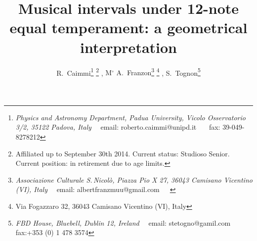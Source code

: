 \documentclass[12pt,a4paper]{article}
\begin{document}
%
%
%                      
%
\def\astrobj#1{#1}
\newenvironment{lefteqnarray}{\arraycolsep=0pt\begin{eqnarray}}
{\end{eqnarray}\protect\aftergroup\ignorespaces}
\newenvironment{lefteqnarray*}{\arraycolsep=0pt\begin{eqnarray*}}
{\end{eqnarray*}\protect\aftergroup\ignorespaces}
\newenvironment{leftsubeqnarray}{\arraycolsep=0pt\begin{subeqnarray}}
{\end{subeqnarray}\protect\aftergroup\ignorespaces}
\newcommand{\diff}{{\rm\,d}}
\newcommand{\pprime}{{\prime\prime}}
\newcommand{\szeta}{\mskip 3mu /\mskip-10mu \zeta}
\newcommand{\FC}{\mskip 0mu {\rm F}\mskip-10mu{\rm C}}
\newcommand{\appleq}{\stackrel{<}{\sim}}
\newcommand{\appgeq}{\stackrel{>}{\sim}}
\newcommand{\Int}{\mathop{\rm Int}\nolimits}
\newcommand{\Nint}{\mathop{\rm Nint}\nolimits}
\newcommand{\range}{{\rm -}}
\newcommand{\displayfrac}[2]{\frac{\displaystyle #1}{\displaystyle #2}}
%
\def\astrobj#1{#1}
%
\title{Musical intervals under 12-note equal temperament: 
a geometrical interpretation}
\author{
{R.~Caimmi}\footnote{
{\it Physics and Astronomy Department, Padua University, Vicolo Osservatorio
3/2, 35122 Padova, Italy}$\quad$
email: roberto.caimmi@unipd.it~~~
fax: 39-049-8278212}
\footnote{Affiliated up to September 30th 2014. Current status: Studioso
Senior. Current position: in retirement due to age limits.}
, {M$^\circ$ A.~Franzon}\footnote{
{\it Associazione Culturale S.\,Nicol\`o, Piazza Pio X 27,
36043 Camisano Vicentino (VI), Italy}$\quad$
email: albertfranzmuu@gmail.com~~~
}
\footnote{Via Fogazzaro 32, 36043 Camisano Vicentino (VI), Italy}
, {S.~Tognon}\footnote{
{\it FBD House, Bluebell, Dublin 12, Ireland}$\quad$
email: stetogno@gamil.com~~~
fax:+353 (0) 1 478 3574 }
\phantom{agga}
}
%
%
\end{document}
